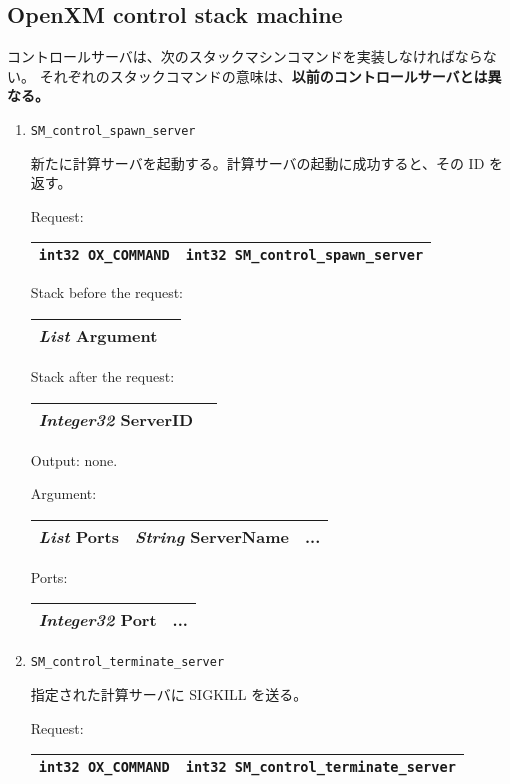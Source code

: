 \documentclass{article}
\begin{document}
\subsection{OpenXM control stack machine}

コントロールサーバは、次のスタックマシンコマンドを実装しなければならない。
それぞれのスタックコマンドの意味は、{\bf 以前のコントロールサーバとは異なる。}

\begin{enumerate}
\item
\begin{verbatim}
SM_control_spawn_server
\end{verbatim}
新たに計算サーバを起動する。計算サーバの起動に成功すると、その ID を返す。

Request:
\begin{tabular}{|c|c|}  \hline
{\tt int32 OX\_COMMAND} & {\tt int32 SM\_control\_spawn\_server}  \\
\hline
\end{tabular}

Stack before the request: 
\begin{tabular}{|c|c|}  \hline
{\sl List} Argument \\
\hline
\end{tabular}

Stack after the request: 
\begin{tabular}{|c|c|}  \hline
{\sl Integer32} ServerID \\
\hline
\end{tabular}

Output: none.

Argument:	 
\begin{tabular}{|c|c|c|}  \hline
{\sl List} Ports & {\sl String} ServerName & ...\\
\hline
\end{tabular}

Ports:
\begin{tabular}{|c|c|}  \hline
{\sl Integer32} Port & ... \\
\hline
\end{tabular}

\item
\begin{verbatim}
SM_control_terminate_server
\end{verbatim}
指定された計算サーバに SIGKILL を送る。

Request:
\begin{tabular}{|c|c|}  \hline
{\tt int32 OX\_COMMAND} & {\tt int32 SM\_control\_terminate\_server}  \\
\hline
\end{tabular}


\end{enumerate}
\end{document}

